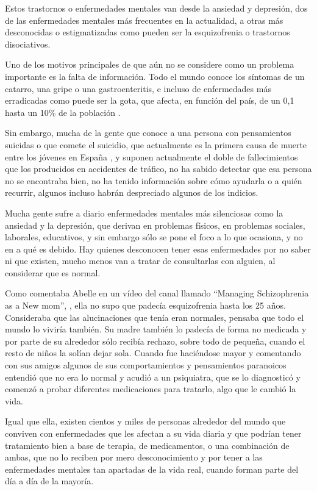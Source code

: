 \documentclass[12pt, a4paper,twoside,titlepage]{book}
\begin{document}
Estos trastornos o enfermedades mentales van desde la ansiedad y depresión, dos de las enfermedades mentales más frecuentes en la actualidad, a otras más desconocidas o estigmatizadas como pueden ser la esquizofrenia o trastornos disociativos. 

Uno de los motivos principales de que aún no se considere como un problema importante es la falta de información. Todo el mundo conoce los síntomas de un catarro, una gripe o una gastroenteritis, e incluso de enfermedades más erradicadas como puede ser la gota, que afecta, en función del país, de un 0,1 hasta un 10\% de la población \cite{articuloIntro2}. 

Sin embargo, mucha de la gente que conoce a una persona con pensamientos suicidas o que comete el suicidio, que actualmente es la primera causa de muerte entre los jóvenes en España \cite{fundacionSuicidio}, y suponen actualmente el doble de fallecimientos que los producidos en accidentes de tráfico, no ha sabido detectar que esa persona no se encontraba bien, no ha tenido información sobre cómo ayudarla o a quién recurrir, algunos incluso habrán despreciado algunos de los indicios. 

Mucha gente sufre a diario enfermedades mentales más silenciosas como la ansiedad y la depresión, que derivan en problemas físicos, en problemas sociales, laborales, educativos, y sin embargo sólo se pone el foco a lo que ocasiona, y no en a qué es debido. Hay quienes desconocen tener esas enfermedades por no saber ni que existen, mucho menos van a tratar de consultarlas con alguien, al considerar que es normal. 

Como comentaba Abelle en un vídeo del canal  llamado ``Managing Schizophrenia as a New mom'', \cite{videoEsquizofrenia}, ella no supo que padecía esquizofrenia hasta los 25 años. Consideraba que las alucinaciones que tenía eran normales, pensaba que todo el mundo lo viviría también. Su madre también lo padecía de forma no medicada y por parte de su alrededor sólo recibía rechazo, sobre todo de pequeña, cuando el resto de niños la solían dejar sola. Cuando fue haciéndose mayor y comentando con sus amigos algunos de sus comportamientos y pensamientos paranoicos entendió que no era lo normal y acudió a un psiquiatra, que se lo diagnosticó y comenzó a probar diferentes medicaciones para tratarlo, algo que le cambió la vida. 

Igual que ella, existen cientos y miles de personas alrededor del mundo que conviven con enfermedades que les afectan a su vida diaria y que podrían tener tratamiento bien a base de terapia, de medicamentos, o una combinación de ambas, que no lo reciben por mero desconocimiento y por tener a las enfermedades mentales tan apartadas de la vida real, cuando forman parte del día a día de la mayoría.
\end{document}
